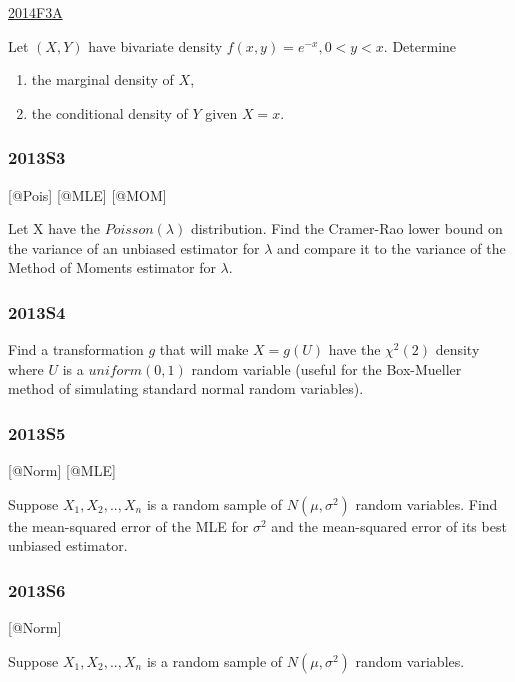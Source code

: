 \documentclass[6pt,twocolumn,Portrait]{article}
\begin{document}
\protect\hyperlink{f3a-1}{2014F3A}

Let \((X,Y)\) have bivariate density \(f(x,y)=e^{-x},0<y<x\). Determine

\begin{enumerate}
\def\labelenumi{(\alph{enumi})}
\item
  the marginal density of \(X\),
\item
  the conditional density of \(Y\) given \(X=x\).
\end{enumerate}

\hypertarget{s3-3}{%
\subsubsection{2013S3}\label{s3-3}}

{[}@Pois{]} {[}@MLE{]} {[}@MOM{]}

Let X have the \(Poisson(\lambda)\) distribution. Find the Cramer-Rao
lower bound on the variance of an unbiased estimator for \(\lambda\) and
compare it to the variance of the Method of Moments estimator for
\(\lambda\).

\hypertarget{s4-3}{%
\subsubsection{2013S4}\label{s4-3}}

Find a transformation \(g\) that will make \(X=g(U)\) have the
\(\chi^2(2)\) density where \(U\) is a \(uniform(0,1)\) random variable
(useful for the Box-Mueller method of simulating standard normal random
variables).

\hypertarget{s5-3}{%
\subsubsection{2013S5}\label{s5-3}}

{[}@Norm{]} {[}@MLE{]}

Suppose \(X_1,X_2,..,X_{n}\) is a random sample of \(N(\mu,\sigma^2)\)
random variables. Find the mean-squared error of the MLE for
\(\sigma^2\) and the mean-squared error of its best unbiased estimator.

\hypertarget{s6-3}{%
\subsubsection{2013S6}\label{s6-3}}

{[}@Norm{]}

Suppose \(X_1,X_2,..,X_{n}\) is a random sample of \(N(\mu,\sigma^2)\)
random variables.
\end{document}
